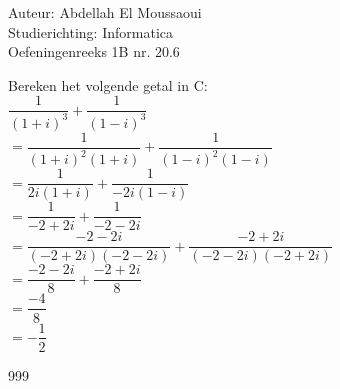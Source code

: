 \documentclass[a4paper]{article}
\begin{document}
  
\noindent \large Auteur: Abdellah El Moussaoui \\
\noindent \large Studierichting: Informatica\\
\noindent \large Oefeningenreeks 1B nr. 20.6\\

\medskip

\normalsize

\medskip

Bereken het volgende getal in C: \\

$\dfrac{1}{(1+i)^3}+\dfrac{1}{(1-i)^3}$\\

$=\dfrac{1}{(1+i)^2(1+i)}+\dfrac{1}{(1-i)^2(1-i)}$\\

$=\dfrac{1}{2i(1+i)}+\dfrac{1}{-2i(1-i)}$\\

$=\dfrac{1}{-2+2i}+\dfrac{1}{-2-2i}$\\

$=\dfrac{-2-2i}{(-2+2i)(-2-2i)}+\dfrac{-2+2i}{(-2-2i)(-2+2i)}$\\

$=\dfrac{-2-2i}{8}+\dfrac{-2+2i}{8}$\\

$=\dfrac{-4}{8}$\\

$=-\dfrac{1}{2}$\\

\begin{thebibliography}{999}
\end{thebibliography}
\end{document}
